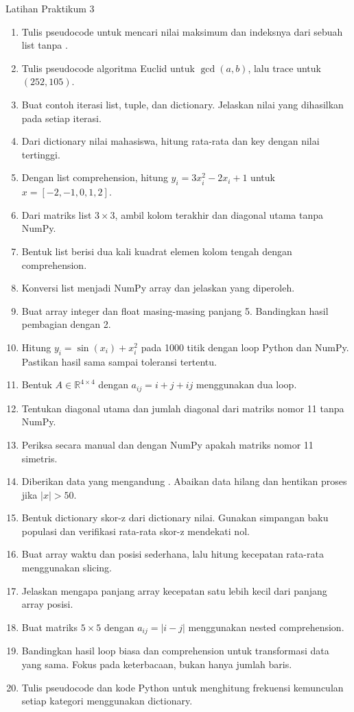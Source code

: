 \documentclass[11pt,a4paper]{report}
\newcommand{\kode}[1]{\texttt{\detokenize{#1}}}
\newcommand{\R}{\mathbb{R}}
\begin{document}
\begin{latihanbox}{Latihan Praktikum 3}
\begin{enumerate}
  \item Tulis pseudocode untuk mencari nilai maksimum dan indeksnya dari sebuah list tanpa \kode{max}.
  \item Tulis pseudocode algoritma Euclid untuk $\gcd(a,b)$, lalu trace untuk $(252,105)$.
  \item Buat contoh iterasi list, tuple, dan dictionary. Jelaskan nilai yang dihasilkan pada setiap iterasi.
  \item Dari dictionary nilai mahasiswa, hitung rata-rata dan key dengan nilai tertinggi.
  \item Dengan list comprehension, hitung $y_i=3x_i^2-2x_i+1$ untuk $x=[-2,-1,0,1,2]$.
  \item Dari matriks list $3\times3$, ambil kolom terakhir dan diagonal utama tanpa NumPy.
  \item Bentuk list berisi dua kali kuadrat elemen kolom tengah dengan comprehension.
  \item Konversi list \kode{[1,4.,-2,7]} menjadi NumPy array dan jelaskan \kode{dtype} yang diperoleh.
  \item Buat array integer dan float masing-masing panjang 5. Bandingkan hasil pembagian dengan 2.
  \item Hitung $y_i=\sin(x_i)+x_i^2$ pada 1000 titik dengan loop Python dan NumPy. Pastikan hasil sama sampai toleransi tertentu.
  \item Bentuk $A\in\R^{4\times4}$ dengan $a_{ij}=i+j+ij$ menggunakan dua loop.
  \item Tentukan diagonal utama dan jumlah diagonal dari matriks nomor 11 tanpa NumPy.
  \item Periksa secara manual dan dengan NumPy apakah matriks nomor 11 simetris.
  \item Diberikan data yang mengandung \kode{None}. Abaikan data hilang dan hentikan proses jika $|x|>50$.
  \item Bentuk dictionary skor-z dari dictionary nilai. Gunakan simpangan baku populasi dan verifikasi rata-rata skor-z mendekati nol.
  \item Buat array waktu dan posisi sederhana, lalu hitung kecepatan rata-rata menggunakan slicing.
  \item Jelaskan mengapa panjang array kecepatan satu lebih kecil dari panjang array posisi.
  \item Buat matriks $5\times5$ dengan $a_{ij}=|i-j|$ menggunakan nested comprehension.
  \item Bandingkan hasil loop biasa dan comprehension untuk transformasi data yang sama. Fokus pada keterbacaan, bukan hanya jumlah baris.
  \item Tulis pseudocode dan kode Python untuk menghitung frekuensi kemunculan setiap kategori menggunakan dictionary.
\end{enumerate}
\end{latihanbox}
\end{document}

